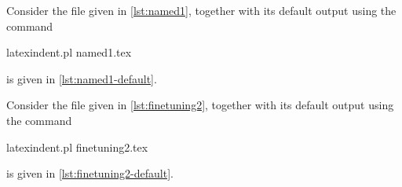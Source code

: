   \begin{example}
  Consider the file given in \cref{lst:named1}, together with its default output using
  the command

  \begin{commandshell}
latexindent.pl named1.tex 
\end{commandshell}

  is given in \cref{lst:named1-default}.

  \begin{cmhtcbraster}[raster column skip=.01\linewidth]
  \end{cmhtcbraster}

  \end{example}

  \begin{example}
  Consider the file given in \cref{lst:finetuning2}, together with its default output
  using the command

  \begin{commandshell}
latexindent.pl finetuning2.tex 
\end{commandshell}

  is given in \cref{lst:finetuning2-default}.

  \begin{cmhtcbraster}[raster column skip=.01\linewidth,
    raster left skip=-3.75cm,
    raster right skip=0cm,]
  \end{cmhtcbraster}

  \end{example}

